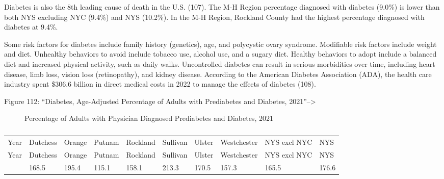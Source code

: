 \documentclass[
  english,
  letterpaper,
]{report}
\begin{document}
Diabetes is also the 8th leading cause of death in the U.S. (107). The
M-H Region percentage diagnosed with diabetes (9.0\%) is lower than both
NYS excluding NYC (9.4\%) and NYS (10.2\%). In the M-H Region, Rockland
County had the highest percentage diagnosed with diabetes at 9.4\%.

Some risk factors for diabetes include family history (genetics), age,
and polycystic ovary syndrome. Modifiable risk factors include weight
and diet. Unhealthy behaviors to avoid include tobacco use, alcohol use,
and a sugary diet. Healthy behaviors to adopt include a balanced diet
and increased physical activity, such as daily walks. Uncontrolled
diabetes can result in serious morbidities over time, including heart
disease, limb loss, vision loss (retinopathy), and kidney disease.
According to the American Diabetes Association (ADA), the health care
industry spent \$306.6 billion in direct medical costs in 2022 to manage
the effects of diabetes (108).

Figure 112: ``Diabetes, Age-Adjusted Percentage of Adults with
Prediabetes and Diabetes, 2021''--\textgreater{}

\begin{figure}


\caption{\label{fig-mddx-predm-dm-percent}Percentage of Adults with
Physician Diagnosed Prediabetes and Diabetes, 2021}

\end{figure}%

\begin{longtable}[]{@{}llllllllll@{}}

\caption{\label{tbl-mddx-predm-dm-percent}Percentage of Adults with
Physician Diagnosed Prediabetes and Diabetes, 2021}

\tabularnewline

\caption{}\label{T_824b2}\tabularnewline
\toprule\noalign{}
Year & Dutchess & Orange & Putnam & Rockland & Sullivan & Ulster &
Westchester & NYS excl NYC & NYS \\
\midrule\noalign{}
\endfirsthead
\toprule\noalign{}
Year & Dutchess & Orange & Putnam & Rockland & Sullivan & Ulster &
Westchester & NYS excl NYC & NYS \\
\midrule\noalign{}
\endhead
\bottomrule\noalign{}
\endlastfoot
2021 & 168.5 & 195.4 & 115.1 & 158.1 & 213.3 & 170.5 & 157.3 & 165.5 &
176.6 \\

\end{longtable}
\end{document}
